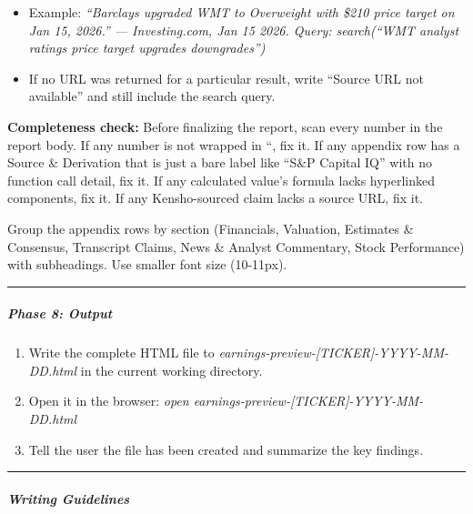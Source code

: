\documentclass[11pt]{article}
\begin{document}
\begin{itemize}[leftmargin=*,itemsep=2pt,topsep=2pt]
\begin{itemize}[leftmargin=*,itemsep=2pt,topsep=2pt]
\item {} Example: \emph{``Barclays upgraded WMT to Overweight with \$210 price target on Jan 15, 2026.'' — Investing.com, Jan 15 2026. Query: search(``WMT analyst ratings price target upgrades downgrades'')}
\item {} If no URL was returned for a particular result, write ``Source URL not available'' and still include the search query.
\end{itemize}
\end{itemize}

\textbf{Completeness check:} Before finalizing the report, scan every number in the report body. If any number is not wrapped in ``, fix it. If any appendix row has a Source \& Derivation that is just a bare label like ``S\&P Capital IQ'' with no function call detail, fix it. If any calculated value's formula lacks hyperlinked components, fix it. If any Kensho-sourced claim lacks a source URL, fix it.


Group the appendix rows by section (Financials, Valuation, Estimates \& Consensus, Transcript Claims, News \& Analyst Commentary, Stock Performance) with subheadings. Use smaller font size (10-11px).


\vspace{0.5em}\hrule\vspace{0.5em}

\subparagraph{Phase 8: Output}\mbox{}\par

\begin{enumerate}[leftmargin=*,itemsep=2pt,topsep=2pt]
\item {} Write the complete HTML file to \emph{earnings-preview-[TICKER]-YYYY-MM-DD.html} in the current working directory.
\item {} Open it in the browser: \emph{open earnings-preview-[TICKER]-YYYY-MM-DD.html}
\item {} Tell the user the file has been created and summarize the key findings.
\end{enumerate}

\vspace{0.5em}\hrule\vspace{0.5em}

\subparagraph{Writing Guidelines}\mbox{}\par
\end{document}
